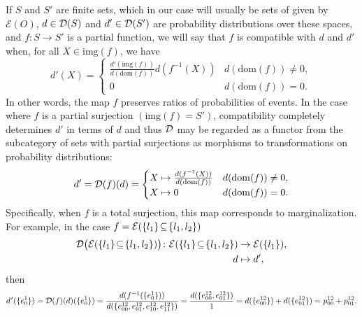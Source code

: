 If $S$ and $S'$ are finite sets, which in our case will usually be sets of \gnpm{} given by $\mathcal{E}(O)$, $d \in \mathcal{D}(S)$ and $d' \in \mathcal{D}(S')$ are probability distributions over these spaces, and $f \colon S \to S'$ is a partial function, we will say that $f$ is compatible with $d$ and $d'$ when, for all $X \in \mathrm{img}(f)$, we have
\begin{equation}
 d'(X) =
  \begin{cases}
    \frac{d'(\mathrm{img}(f))}{d(\mathrm{dom}(f))}d(f^{-1}(X)) & d(\mathrm{dom}(f)) \neq 0, \\
    0 & d(\mathrm{dom}(f)) = 0.
  \end{cases}
\end{equation}
In other words, the map $f$ preserves ratios of probabilities of events.  In the case where $f$ is a partial surjection $(\mathrm{img}(f)=S')$, compatibility completely determines $d'$ in terms of $d$ and thus $\mathcal{D}$ may be regarded as a functor from the subcategory of sets with partial surjections as morphisms to transformations on probability distributions:
\begin{equation}\label{eq:distfunctor}
 d' = \mathcal{D}(f)(d) =
  \begin{cases}
    X \mapsto \frac{d(f^{-1}(X))}{d(\mathrm{dom}(f))} & d(\mathrm{dom}(f)) \neq 0, \\
    X \mapsto 0 & d(\mathrm{dom}(f)) = 0.
  \end{cases}
\end{equation}
Specifically, when $f$ is a total surjection, this map corresponds to marginalization. For example, in the case $f = \mathcal{E} ( \{ l_1 \} \! \subseteq \! \{ l_1, l_2 \} )$
\begin{equation}\label{eq:dfunctorex}
\begin{split}
\mathcal{D} \big(\mathcal{E} ( \{ l_1 \} \! \subseteq \! \{ l_1, l_2 \} ) \big) \colon \mathcal{E} ( \{ l_1 \} \! \subseteq \! \{ l_1, l_2 \} ) &\to \mathcal{E} ( \{ l_1 \} ), \\
d &\mapsto d',
\end{split}
\end{equation}
then
\begin{equation}\label{eq:margexample}
d\hspace{.09em}'(\{e^1_0\}) = \mathcal{D} (f)(d)(\{e^1_0\}) = \frac{d(f^{-1}(\{ e^1_0\}))}{d(\{ e^{12}_{00},e^{12}_{01},e^{12}_{10},e^{12}_{11} \})} = \frac{d(\{ e^{12}_{00},e^{12}_{01}\})}{1} = d( \{ e^{12}_{00} \} ) + d( \{ e^{12}_{01} \} ) = p^{12}_{00} + p^{12}_{01}.
\end{equation}
